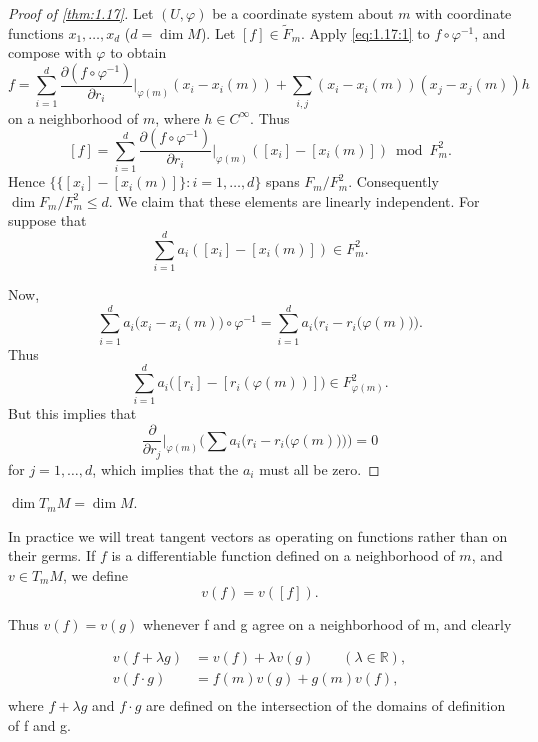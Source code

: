 \begin{proof}[Proof of \ref{thm:1.17}]
	Let $(U,\varphi)$ be a coordinate system about $m$ with coordinate
	functions $x_1,\ldots,x_d$ ($d=\dim M$). Let $[f]\in\widetilde{F}_m$. Apply \eqref{eq:1.17:1}
	to $f\circ\varphi^{-1}$, and compose with $\varphi$ to obtain
	\[
		f=\sum_{i=1}^{d}\frac{\partial(f\circ\varphi^{-1})}{\partial r_{i}}\bigg|_{\varphi(m)}(x_{i}-x_{i}(m))+\sum_{i,j}(x_{i}-x_{i}(m))(x_{j}-x_{j}(m))h
	\]
	on a neighborhood of $m$, where $h \in C^{\infty}$. Thus
	\[
		[f]=\sum_{i=1}^{d}\frac{\partial(f\circ\varphi^{-1})}{\partial r_{i}}\bigg|_{\varphi(m)}\left([x_{i}]-[x_{i}(m)]\right)\bmod F_{m}^{2}.
	\]
	Hence $\{\{[x_{i}]-[x_{i}(m)]\}: i=1,\ldots,d\}$ spans $F_{m}/F_{m}^{2}$. Consequently $\dim F_{m}/F_{m}^{2} \leq d$. We claim
	that these elements are linearly independent. For suppose that
	\[
		\sum_{i=1}^{d}a_{i}([x_{i}]-[x_{i}(m)])\in F_{m}^{2}.
	\]

	Now,
	\[
		\sum_{i=1}^{d}a_{i}\big(x_{i}-x_{i}(m)\big)\circ\varphi^{-1}=\sum_{i=1}^{d}a_{i}\big(r_{i}-r_{i}\big(\varphi(m)\big)\big).
	\]
	Thus
	\[
		\sum_{i=1}^{d}a_{i}\big([r_{i}]-[r_i(\varphi(m))]\big)\in F_{\varphi(m)}^{2}.
	\]
	But this implies that
	\[
		\frac{\partial}{\partial r_{j}}\bigg|_{\varphi(m)}\big(\textstyle\sum a_{i}\big(r_{i}-r_{i}\big(\varphi(m)\big)\big)\big)=0
	\]
	for $j=1,\ldots,d$, which implies that the $a_{i}$ must all be zero.
\end{proof}

\begin{corollary*}
	$\dim T_{m} M = \dim M$.
\end{corollary*}

\label{thm:1.18}
In practice we will treat tangent vectors as operating on functions rather than on their germs.
If $f$ is a differentiable function defined on a neighborhood of $m$, and $v \in T_{m} M$, we define
\begin{equation}
	\tag{1}\label{eq:1.18:1}
	v(f)=v([f]).
\end{equation}

Thus  $ v(f) = v(g) $ whenever f and g agree on a neighborhood of m, and clearly

\begin{equation}
	\tag{2}\label{eq:1.18:2}
	\begin{aligned}{v(f+\lambda g)}&{{}=v(f)+\lambda v(g)\qquad(\lambda\in\mathbb{R}),}\\ {v(f\cdot g)}&{{}=f(m)v(g)+g(m)v(f),}\\ \end{aligned}
\end{equation}
where  $ f + \lambda g $ and  $ f \cdot g $ are defined on the intersection of the domains of definition of f and g.


